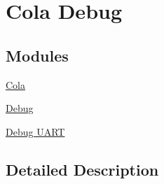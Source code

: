 \hypertarget{group___cola___debug}{}\section{Cola Debug}
\label{group___cola___debug}
\subsection*{Modules}
\begin{DoxyCompactItemize}
\item 
\hyperlink{group___cola}{Cola}
\item 
\hyperlink{group___debug}{Debug}
\item 
\hyperlink{group___debug___uart}{Debug U\+A\+RT}
\end{DoxyCompactItemize}


\subsection{Detailed Description}
